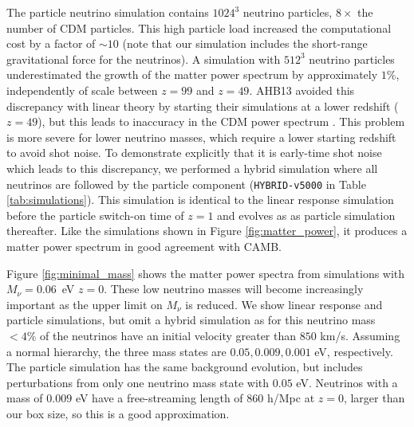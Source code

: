 \documentclass[useAMS, usenatbib]{mnras}
\begin{document}
The particle neutrino simulation contains $1024^3$ neutrino particles, $8\times$ the number of CDM particles. This high particle load increased the computational cost by a factor of $\sim 10$ (note that our simulation includes the short-range gravitational force for the neutrinos). A simulation with $512^3$ neutrino particles underestimated the growth of the matter power spectrum by approximately $1\%$, independently of scale between $z=99$ and $z=49$. AHB13 avoided this discrepancy with linear theory by starting their simulations at a lower redshift ($z=49$), but this leads to inaccuracy in the CDM power spectrum \citep{Heitmann:2010}. This problem is more severe for lower neutrino masses, which require a lower starting redshift to avoid shot noise. To demonstrate explicitly that it is early-time shot noise which leads to this discrepancy, we performed a hybrid simulation where all neutrinos are followed by the particle component (\texttt{HYBRID-v5000} in Table \ref{tab:simulations}). This simulation is identical to the linear response simulation before the particle switch-on time of $z=1$ and evolves as as particle simulation thereafter. Like the simulations shown in Figure \ref{fig:matter_power}, it produces a matter power spectrum in good agreement with CAMB.

Figure \ref{fig:minimal_mass} shows the matter power spectra from simulations with $M_\nu = 0.06$~eV $z=0$. These low neutrino masses will become increasingly important as the upper limit on $M_\nu$ is reduced. We show linear response and particle simulations, but omit a hybrid simulation as for this neutrino mass $ < 4\%$ of the neutrinos have an initial velocity greater than $850$ km/s. Assuming a normal hierarchy, the three mass states are $0.05, 0.009, 0.001$ eV, respectively. The particle simulation has the same background evolution, but includes perturbations from only one neutrino mass state with $0.05$ eV. Neutrinos with a mass of $0.009$ eV have a free-streaming length of $860$ h/Mpc at $z=0$, larger than our box size, so this is a good approximation.
\end{document}

